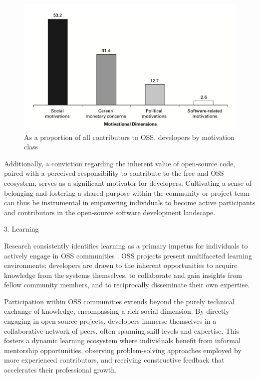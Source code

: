\begin{figure}[ht]
    \centering
    \includegraphics[width=0.8\linewidth]{figs/motivationDimension.png}
    \caption{As a proportion of all contributors to OSS, developers by motivation class \cite{ghosh2002free}}
    \label{fig:motivationDimension}
\end{figure}

Additionally,  a conviction regarding the inherent value of open-source code, paired with a perceived responsibility to contribute to the free and OSS ecosystem, serves as a significant motivator for developers. Cultivating a sense of belonging and fostering a shared purpose within the community or project team can thus be instrumental in empowering individuals to become active participants and contributors in the open-source software development landscape.



3. Learning

Research consistently identifies learning as a primary impetus for individuals to actively engage in OSS communities \parencite{06ye2003toward, 07zhao2024openrank, 08zhang2024paid, 09lakhani2005hackers, 10wu2007empirical, 11gerosa2021shifting, 12choi2015characteristics, 17alexander2002working, 18oreg2008exploring}. OSS projects present multifaceted learning environments; developers are drawn to the inherent opportunities to acquire knowledge from the systems themselves, to collaborate and gain insights from fellow community members, and to reciprocally disseminate their own expertise.

Participation within OSS communities extends beyond the purely technical exchange of knowledge, encompassing a rich social dimension. By directly engaging in open-source projects, developers immerse themselves in a collaborative network of peers, often spanning skill levels and expertise. This fosters a dynamic learning ecosystem where individuals benefit from informal mentorship opportunities, observing problem-solving approaches employed by more experienced contributors, and receiving constructive feedback that accelerates their professional growth.

